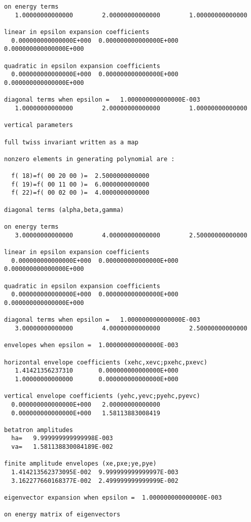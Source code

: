 \begin{footnotesize}
\begin{verbatim}
on energy terms
   1.00000000000000        2.00000000000000        1.00000000000000

linear in epsilon expansion coefficients
  0.000000000000000E+000  0.000000000000000E+000  0.000000000000000E+000

quadratic in epsilon expansion coefficients
  0.000000000000000E+000  0.000000000000000E+000  0.000000000000000E+000

diagonal terms when epsilon =   1.000000000000000E-003
   1.00000000000000        2.00000000000000        1.00000000000000

vertical parameters

full twiss invariant written as a map

nonzero elements in generating polynomial are :

  f( 18)=f( 00 20 00 )=  2.5000000000000
  f( 19)=f( 00 11 00 )=  6.0000000000000
  f( 22)=f( 00 02 00 )=  4.0000000000000

diagonal terms (alpha,beta,gamma)

on energy terms
   3.00000000000000        4.00000000000000        2.50000000000000

linear in epsilon expansion coefficients
  0.000000000000000E+000  0.000000000000000E+000  0.000000000000000E+000

quadratic in epsilon expansion coefficients
  0.000000000000000E+000  0.000000000000000E+000  0.000000000000000E+000

diagonal terms when epsilon =   1.000000000000000E-003
   3.00000000000000        4.00000000000000        2.50000000000000

envelopes when epsilon =  1.000000000000000E-003

horizontal envelope coefficients (xehc,xevc;pxehc,pxevc)
   1.41421356237310       0.000000000000000E+000
   1.00000000000000       0.000000000000000E+000

vertical envelope coefficients (yehc,yevc;pyehc,pyevc)
  0.000000000000000E+000   2.00000000000000
  0.000000000000000E+000   1.58113883008419

betatron amplitudes
  ha=   9.999999999999998E-003
  va=   1.581138830084189E-002

finite amplitude envelopes (xe,pxe;ye,pye)
  1.414213562373095E-002  9.999999999999997E-003
  3.162277660168377E-002  2.499999999999999E-002

eigenvector expansion when epsilon =  1.000000000000000E-003

on energy matrix of eigenvectors


\end{verbatim}
\end{footnotesize}
